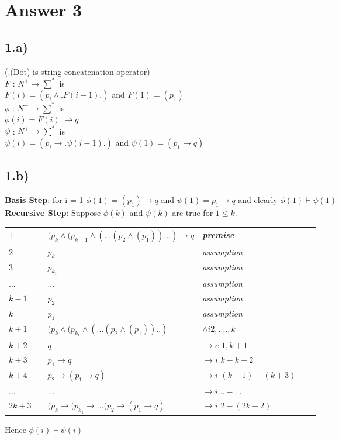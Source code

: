 \documentclass[12pt]{article}
\begin{document}
\section*{Answer 3}
\subsection*{1.a)}
(.(Dot) is string concatenation operator) \\
$F$ : $N^+ \to \sum^*$ is \\
$F(i) = (p_{i}\land .F(i-1).)$ and $F (1) = (p_1)$ \\
$\phi$ : $N^+ \to \sum^*$ is \\
$\phi(i) = F(i).\to q$ \\
$\psi$ : $N^+ \to \sum^*$ is \\
$\psi(i) = (p_{i}\to .\psi(i-1).)$ and $\psi (1) = (p_1\to q)$ 
\subsection*{1.b)}
\textbf{Basis Step}: for i = 1 $\phi(1) = (p_1) \to q$ and $\psi(1) = p_1 \to q$ and clearly $\phi(1) \vdash \psi(1)$ \\
\textbf{Recursive Step}:
Suppose $\phi(k)$ and $\psi(k)$ are true for $1\leq k$.
\begin{table}[H]
	\centering
\begin{tabular}{*6{l}}
	$1$ & &  $(p_k\land (p_{k-1}\land (...(p_2\land (p_1))...) \to q $ & \textit{premise} & \\ \hline 
	
	$2$ & &  $p_k$ &\textit{assumption} & \\  \hline
	
	$3$ & &  $p_{k_1}$ &  \textit{assumption} & \\ \hline
	
	$...$ & &  $...$ & \textit{assumption} & \\ \hline 
	
	$k-1$ & &  $p_2$ &  \textit{assumption} & \\ \hline
	
	$k$ & &  $p_1$ &  \textit{assumption} & \\ 
	
	$k+1$ & &  $(p_k\land(p_{k_1}\land (...(p_2\land (p_1))..)$ & $\land i2,....,k$ & \\
	
	$k+2$ & & $q$ & $\to e$ $1,k+1$ & \\ \hline
	
	$k+3$ & &  $p_1 \to q$ & $\to i$ $k-k+2$ \\ \hline
	
	$k+4$ & &  $p_2\to(p_1 \to q)$ & $\to i$ $(k-1)-(k+3)$ & \\ \hline 
	
	$...$ & &  $...$ & $\to i ...-...$ & \\ \hline 
	$2k+3$ & &  $(p_k\to(p_{k_1}\to ...(p_2\to(p_1 \to q)$ & $\to i$ $2-(2k+2)$ & \\  
\end{tabular}
\end{table}
Hence $\phi(i) \vdash \psi(i)$
\end{document}
